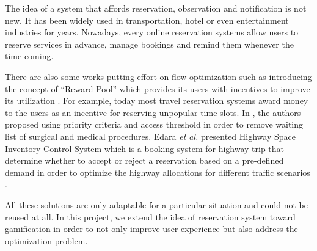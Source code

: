 The idea of a system that affords reservation, observation and notification is not new. It has been widely used in transportation, hotel or even entertainment industries for years. Nowadays, every online reservation systems allow users to reserve services in advance, manage bookings and remind them whenever the time coming. 

There are also some works putting effort on flow optimization such as introducing the concept of ``Reward Pool'' which provides its users with incentives to improve its utilization \cite{winand2006methods}. For example, today most travel reservation systems  award money to the users as an incentive for reserving unpopular time slots. In \cite{gauld2000solving}, the authors proposed using priority criteria and access threshold in order to remove waiting list of surgical and medical procedures. Edara \emph{et al.} presented Highway Space Inventory Control System which is a booking system for highway trip that determine whether to accept or reject a reservation based on a pre-defined demand in order to optimize the highway allocations for different traffic scenarios \cite{edara2008model}. 

All these solutions are only adaptable for a particular situation and could not be reused at all. In this project, we extend the idea of reservation system toward gamification in order to not only improve user experience but also address the optimization problem.